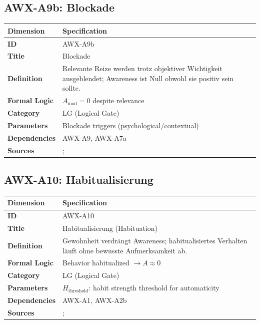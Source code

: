 
\subsection{AWX-A9b: Blockade}

\begin{table}[htbp]
\small
\begin{tabular}{p{3cm}p{11cm}}
\toprule
\textbf{Dimension} & \textbf{Specification} \\
\midrule
\textbf{ID} & AWX-A9b \\
\textbf{Title} & Blockade \\
\textbf{Definition} & Relevante Reize werden trotz objektiver Wichtigkeit ausgeblendet; Awareness ist Null obwohl sie positiv sein sollte. \\
\textbf{Formal Logic} & $A_{\text{mod}} = 0$ despite relevance \\
\textbf{Category} & LG (Logical Gate) \\
\textbf{Parameters} & Blockade triggers (psychological/contextual) \\
\textbf{Dependencies} & AWX-A9, AWX-A7a \\
\textbf{Sources} & \citet{benartzi2004save}; \citet{choi2004optimal} \\
\bottomrule
\end{tabular}
\end{table}


\subsection{AWX-A10: Habitualisierung}

\begin{table}[htbp]
\small
\begin{tabular}{p{3cm}p{11cm}}
\toprule
\textbf{Dimension} & \textbf{Specification} \\
\midrule
\textbf{ID} & AWX-A10 \\
\textbf{Title} & Habitualisierung (Habituation) \\
\textbf{Definition} & Gewohnheit verdrängt Awareness; habitualisiertes Verhalten läuft ohne bewusste Aufmerksamkeit ab. \\
\textbf{Formal Logic} & Behavior habitualized $\rightarrow A \approx 0$ \\
\textbf{Category} & LG (Logical Gate) \\
\textbf{Parameters} & $H_{\text{threshold}}$: habit strength threshold for automaticity \\
\textbf{Dependencies} & AWX-A1, AWX-A2b \\
\textbf{Sources} & \citet{wood2016psychology}; \citet{ouellette1998habit} \\
\bottomrule
\end{tabular}
\end{table}

